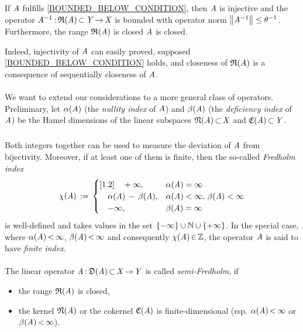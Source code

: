 \documentclass[11pt,twoside]{article}
\begin{document}
\begin{theorem1}\label{BOUNDED_BELOW_THEOREM}
If $\mathit{A}$ fulfills \eqref{BOUNDED_BELOW_CONDITION},
then $\mathit{A}$ is injective and the operator
$\mathit{A}^{-1} {\,:\,} \mathfrak{R}(\mathit{A}) {\,\subset\,} \mathit{Y} {\,\to\,} \mathit{X}$ is bounded
with operator norm $\left\lVert \mathit{A}^{-1} \right\rVert \leq \theta^{-1}$.
Furthermore,
the range $\mathfrak{R}(\mathit{A})$ is closed \iff $\mathit{A}$ is closed.
\end{theorem1}

Indeed,
injectivity of $\mathit{A}$ can easily proved,
supposed \eqref{BOUNDED_BELOW_CONDITION} holds,
and closeness of $\mathfrak{R}(\mathit{A})$ is a consequence of sequentially closeness
of $\mathit{A}$.

\paragraph{} %
We want to extend our considerations to a more general class of operators.
Preliminary,
let $\alpha(\mathit{A})$ (the \textit{nullity index} of $\mathit{A}$)
and $\beta(\mathit{A})$ (the \textit{deficiency index} of $\mathit{A}$)
be the Hamel dimensions of the linear subspaces
$\mathfrak{N}(\mathit{A}) {\,\subset\,} \mathit{X}$ and $\mathfrak{C}{(\mathit{A})} {\,\subset\,} \mathit{Y}$.

\subparagraph{} %
Both integers together can be used
to measure the deviation of $\mathit{A}$ from bijectivity.
Moreover,
if at least one of them is finite,
then the so-called \textit{Fredholm index}
\[
\chi(\mathit{A}) \,:=\,
\begin{cases}[1.2]
\quad + \infty, & \alpha(\mathit{A}) = \infty\\
\quad \alpha(\mathit{A}) \, - \, \beta(\mathit{A}), &
\alpha(\mathit{A}) < \infty, \, \beta(\mathit{A}) < \infty\\
\quad - \infty, & \beta(\mathit{A}) = \infty\\
\end{cases}
\]
is well-defined and takes values in the set
$\{- \infty\} \cup {\mathbb{N}} \cup \{+ \infty\}$.
In the special case,
where $\alpha(\mathit{A}) {\,<\,} \infty$,
$\beta(\mathit{A}) {\,<\,} \infty$
and consequently $\chi(\mathit{A}) {\,\in\,} {\mathbb{Z}}$,
the operator $\mathit{A}$ is said to have \textit{finite index}.

\paragraph{} %
The linear operator $\mathit{A} {\,:\,} \mathfrak{D}(\mathit{A}) {\,\subset\,} \mathit{X} {\,\to\,} \mathit{Y}$
is called \textit{semi-Fredholm},
if
\begin{itemize}[leftmargin=12mm]
\item[(F-1)] the range $\mathfrak{R}(\mathit{A})$ is closed,
\item[(F-2)] the kernel $\mathfrak{N}(\mathit{A}) $ or the cokernel $\mathfrak{C}{(\mathit{A})} $
             is finite-dimensional
             (rsp. $\alpha(\mathit{A}) {\,<\,} \infty$ or
                   $\beta(\mathit{A})  {\,<\,} \infty$).
\end{itemize}
\end{document}
